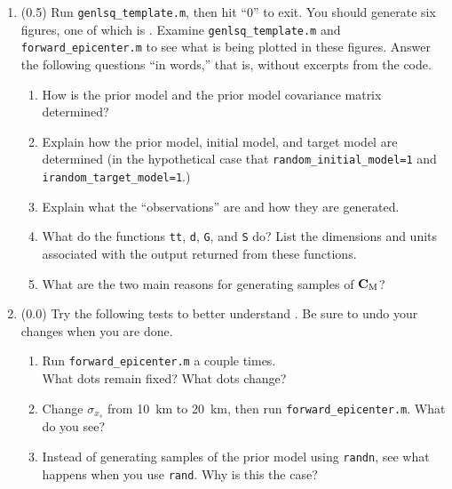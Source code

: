 \documentclass[11pt,titlepage,fleqn]{article}
\begin{document}
\begin{enumerate}
\item (0.5)
Run \verb+genlsq_template.m+, then hit ``0'' to exit. You should generate six figures, one of which is . Examine \verb+genlsq_template.m+ and \verb+forward_epicenter.m+ to see what is being plotted in these figures. Answer the following questions ``in words,'' that is, without excerpts from the code.

\begin{enumerate}
\item How is the prior model and the prior model covariance matrix determined?

\item Explain how the prior model, initial model, and target model are determined (in the hypothetical case that \verb+random_initial_model=1+ and \verb+irandom_target_model=1+.)

\item Explain what the ``observations'' are and how they are generated.

\item What do the functions \verb+tt+, \verb+d+, \verb+G+, and \verb+S+ do? List the dimensions and units associated with the output returned from these functions.

\item What are the two main reasons for generating samples of $\mbox{${\bf C}$}_{\rm M}$?

\end{enumerate}


\item (0.0) Try the following tests to better understand . Be sure to undo your changes when you are done.
%
\begin{enumerate}
\item Run \verb+forward_epicenter.m+ a couple times. \\
What dots remain fixed? What dots change?

\item Change $\sigma_{x_s}$ from 10~km to 20~km, then run \verb+forward_epicenter.m+. What do you see?

\item Instead of generating samples of the prior model using \verb+randn+, see what happens when you use \verb+rand+. Why is this the case?
\end{enumerate}



\end{enumerate}
\end{document}
